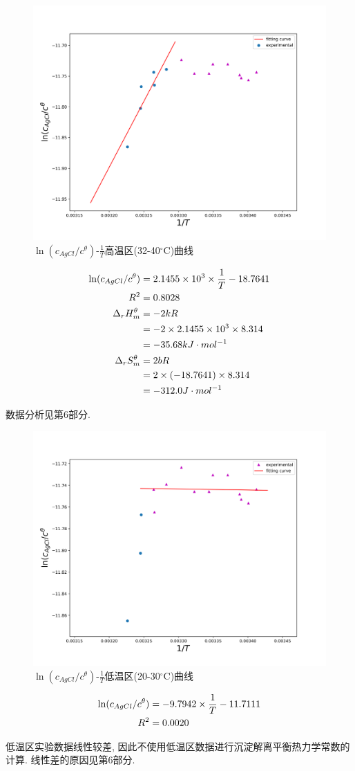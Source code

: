 \documentclass[a4paper]{article}
\begin{document}
\begin{figure}[H]
	\centering
	\includegraphics[width = 0.5\linewidth]{fig/high.png}
	\caption{$\ln(c_{AgCl}/c^{\theta})$-$\frac{1}{T}$高温区(32-40$^\circ$C)曲线}
	\label{}
\end{figure}
\begin{equation}
	\centering
	\begin{aligned}
		\ln(c_{AgCl}/c^{\theta}) &= 2.1455\times 10^{3} \times \frac{1}{T} - 18.7641\\
		R^{2} &= 0.8028 \\
		\Delta_{r}H^{\theta}_{m} &= -2kR \\
		&= -2\times 2.1455\times 10^{3} \times 8.314\\
		&= -35.68 kJ\cdot mol^{-1}\\
		\Delta_{r}S^{\theta}_{m} &= 2bR\\
		&=2\times (-18.7641) \times 8.314\\
		&= -312.0 J\cdot mol^{-1}
	\end{aligned}
\end{equation}
\par
数据分析见第6部分.
\begin{figure}[H]
	\centering
	\includegraphics[width = 0.5\linewidth]{fig/low.png}
	\caption{$\ln(c_{AgCl}/c^{\theta})$-$\frac{1}{T}$低温区(20-30$^\circ$C)曲线}
	\label{}
\end{figure}
\begin{equation}
	\centering
	\begin{aligned}
		\ln(c_{AgCl}/c^{\theta}) &= -9.7942\times \frac{1}{T} - 11.7111\\
		R^{2} &= 0.0020
	\end{aligned}
\end{equation}
\par
低温区实验数据线性较差, 因此不使用低温区数据进行沉淀解离平衡热力学常数的计算. 
线性差的原因见第6部分.
\end{document}
